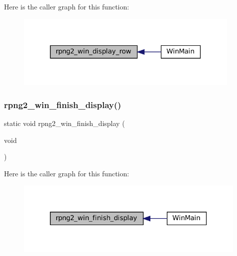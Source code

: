 Here is the caller graph for this function\+:
\nopagebreak
\begin{figure}[H]
\begin{center}
\leavevmode
\includegraphics[width=306pt]{rpng2-win_8c_ac1b02b7289e3c18572f9de09314a0326_icgraph}
\end{center}
\end{figure}
\mbox{\label{rpng2-win_8c_a9b4d806dceb4ddfa57f4007272955357}} 
\subsubsection{\texorpdfstring{rpng2\+\_\+win\+\_\+finish\+\_\+display()}{rpng2\_win\_finish\_display()}}
{\footnotesize\ttfamily static void rpng2\+\_\+win\+\_\+finish\+\_\+display (\begin{DoxyParamCaption}\item[{void}]{ }\end{DoxyParamCaption})\hspace{0.3cm}{\ttfamily [static]}}

Here is the caller graph for this function\+:
\nopagebreak
\begin{figure}[H]
\begin{center}
\leavevmode
\includegraphics[width=315pt]{rpng2-win_8c_a9b4d806dceb4ddfa57f4007272955357_icgraph}
\end{center}
\end{figure}
\mbox{\label{rpng2-win_8c_a47fb2441423f2e30f4cfe4f427159e70}} 
